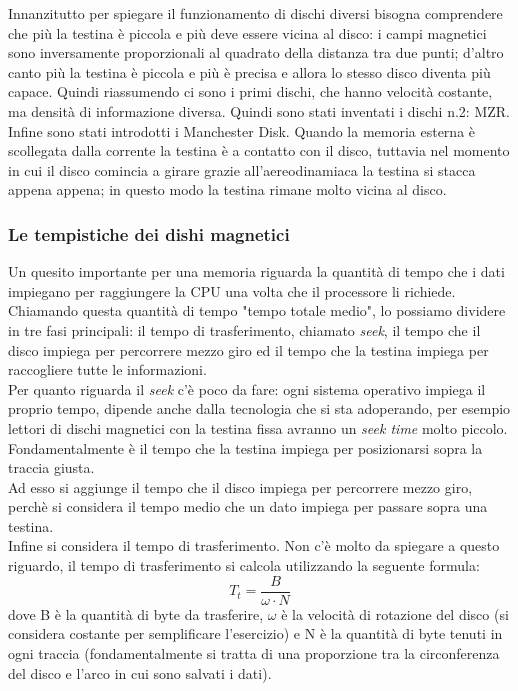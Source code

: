 \documentclass{article}
\begin{document}
 Innanzitutto per spiegare il funzionamento di dischi diversi bisogna comprendere che più la testina è piccola e più deve essere vicina al disco: i campi magnetici sono inversamente proporzionali al quadrato della distanza tra due punti; d'altro canto più la testina è piccola e più è precisa e allora lo stesso disco diventa più capace.
 Quindi riassumendo ci sono i primi dischi, che hanno velocità costante, ma densità di informazione diversa. Quindi sono stati inventati i dischi n.2: MZR. \\
 \indent Infine sono stati introdotti i Manchester Disk. Quando la memoria esterna è scollegata dalla corrente la testina è a contatto con il disco, tuttavia nel momento in cui il disco comincia a girare grazie all'aereodinamiaca la testina si stacca appena appena; in questo modo la testina rimane molto vicina al disco.

 \subsubsection{Le tempistiche dei dishi magnetici}

 Un quesito importante per una memoria riguarda la quantità di tempo che i dati impiegano per raggiungere la CPU una volta che il processore li richiede. Chiamando questa quantità di tempo "tempo totale medio", lo possiamo dividere in tre fasi principali: il tempo di trasferimento, chiamato \textit{seek}, il tempo che il disco impiega per percorrere mezzo giro ed il tempo che la testina impiega per raccogliere tutte le informazioni.\\

 Per quanto riguarda il \textit{seek} c'è poco da fare: ogni sistema operativo impiega il proprio tempo, dipende anche dalla tecnologia che si sta adoperando, per esempio lettori di dischi magnetici con la testina fissa avranno un \textit{seek time} molto piccolo. Fondamentalmente è il tempo che la testina impiega per posizionarsi sopra la traccia giusta.\\

 Ad esso si aggiunge il tempo che il disco impiega per percorrere mezzo giro, perchè si considera il tempo medio che un dato impiega per passare sopra una testina.\\

 Infine si considera il tempo di trasferimento. Non c'è molto da spiegare a questo riguardo, il tempo di trasferimento si calcola utilizzando la seguente formula:
 \begin{equation}
 	T_t=\frac{B}{\omega \cdot N}
 \end{equation}
 dove B è la quantità di byte da trasferire, $\omega$ è la velocità di rotazione del disco (si considera costante per semplificare l'esercizio) e N è la quantità di byte tenuti in ogni traccia (fondamentalmente si tratta di una proporzione tra la circonferenza del disco e l'arco in cui sono salvati i dati).
\end{document}
